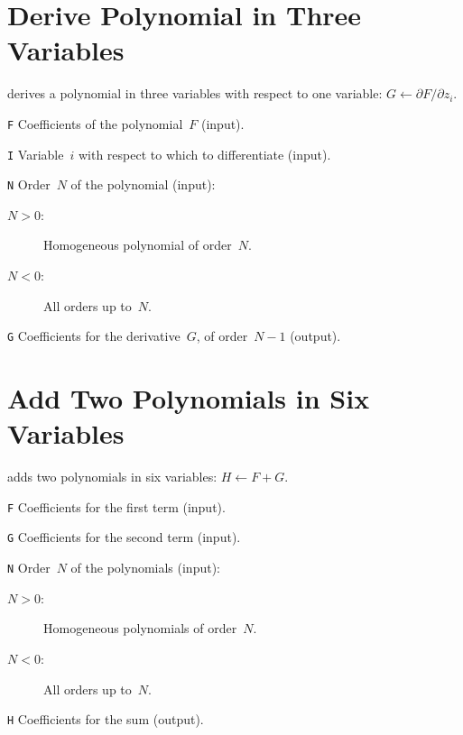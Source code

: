 \section{Derive Polynomial in Three Variables}
\label{PA3DIF}
derives a polynomial in three variables with respect to one variable:
$G \leftarrow \partial F / \partial z_i$.
\begin{mylist}
\item[\tt F]
Coefficients of the polynomial~$F$ (input).
\item[\tt I]
Variable~$i$ with respect to which to differentiate (input).
\item[\tt N]
Order~$N$ of the polynomial (input):
\begin{description}
\item[$N > 0$:] Homogeneous polynomial of order~$N$.
\item[$N < 0$:] All orders up to~$N$.
\end{description}
\item[\tt G]
Coefficients for the derivative~$G$, of order~$N - 1$ (output).
\end{mylist}

\section{Add Two Polynomials in Six Variables}
\label{PA6ADD}
adds two polynomials in six variables: $H \leftarrow F + G$.
\begin{mylist}
\item[\tt F]
Coefficients for the first term (input).
\item[\tt G]
Coefficients for the second term (input).
\item[\tt N]
Order~$N$ of the polynomials (input):
\begin{description}
\item[$N > 0$:] Homogeneous polynomials of order~$N$.
\item[$N < 0$:] All orders up to~$N$.
\end{description}
\item[\tt H]
Coefficients for the sum (output).
\end{mylist}

